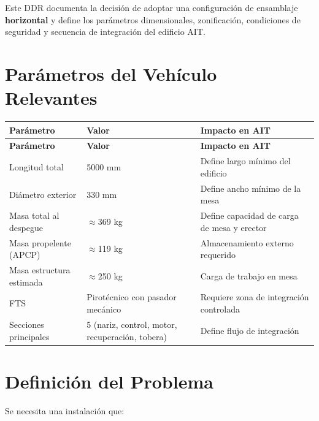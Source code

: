 \documentclass[11pt, a4paper]{article}
\begin{document}
Este DDR documenta la decisión de adoptar una configuración de ensamblaje \textbf{horizontal} y define los parámetros dimensionales, zonificación, condiciones de seguridad y secuencia de integración del edificio AIT.

\section{Parámetros del Vehículo Relevantes}

\begin{longtable}{L{5.5cm} C{3cm} L{5cm}}
  \color{white}\textbf{Parámetro} &
  \color{white}\textbf{Valor} &
  \color{white}\textbf{Impacto en AIT} \\
  \endfirsthead
  \color{white}\textbf{Parámetro} &
  \color{white}\textbf{Valor} &
  \color{white}\textbf{Impacto en AIT} \\
  \endhead
  Longitud total              & 5000 mm    & Define largo mínimo del edificio \\
  Diámetro exterior           & 330 mm     & Define ancho mínimo de la mesa \\
  Masa total al despegue      & $\approx$369 kg & Define capacidad de carga de mesa y erector \\
  Masa propelente (APCP)      & $\approx$119 kg & Almacenamiento externo requerido \\
  Masa estructura estimada    & $\approx$250 kg & Carga de trabajo en mesa \\
  FTS                         & Pirotécnico con pasador mecánico & Requiere zona de integración controlada \\
  Secciones principales       & 5 (nariz, control, motor, recuperación, tobera) & Define flujo de integración \\
\end{longtable}

\section{Definición del Problema}

Se necesita una instalación que:
\end{document}
